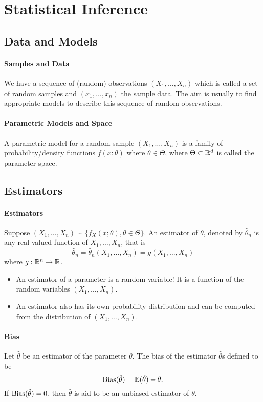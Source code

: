 \section{Statistical Inference}

\subsection{Data and Models}
\paragraph{Samples and Data}
We have a sequence of (random) observations \((X_1, \dots, X_n)\) which is called a set of random samples and \((x_1, \dots, x_n)\) the sample data. The aim is usually to find appropriate models to describe this sequence of random observations.

\paragraph{Parametric Models and Space}
A parametric model for a random sample \((X_1, \dots, X_n)\) is a family of probability/density functions \(f(x:\theta)\) where \(\theta \in \Theta\), where \(\Theta \subset \mathbb{R}^d\) is called the parameter space.

\subsection{Estimators}
\paragraph{Estimators}
Suppose \((X_1, \dots, X_n) \sim \{f_X(x;\theta), \theta \in \Theta\}\). An estimator of \(\theta\), denoted by \(\hat{\theta}_n\) is any real valued function of \(X_1, \dots, X_n\), that is
\[\hat{\theta}_n = \hat{\theta}_n(X_1, \dots, X_n) = g(X_1, \dots, X_n)\]
where \(g: \mathbb{R}^n \to \mathbb{R}\).
\begin{itemize}
    \item An estimator of a parameter is a random variable! It is a function of the random variables \((X_1, \dots, X_n)\).
    \item An estimator also has its own probability distribution and can be computed from the distribution of \((X_1, \dots, X_n)\).
\end{itemize}

\paragraph{Bias}
Let \(\hat{\theta}\) be an estimator of the parameter \(\theta\). The bias of the estimator \(\hat{\theta}\)s defined to be
\[\mathrm{Bias}(\hat{\theta}) = \mathbb{E}(\hat{\theta}) - \theta.\]
If \(\mathrm{Bias}(\hat{\theta}) = 0\), then \(\hat{\theta}\) is aid to be an unbiased estimator of \(\theta\).

